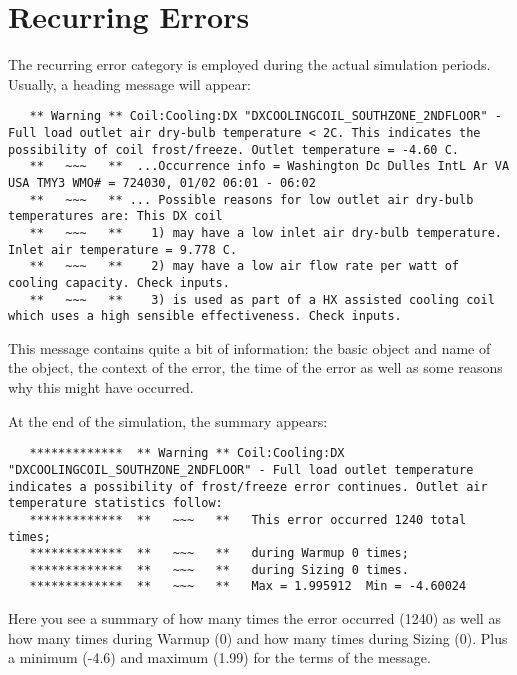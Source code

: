 \section{Recurring Errors}\label{recurring-errors}

The recurring error category is employed during the actual simulation periods. Usually, a heading message will appear:

\begin{lstlisting}
   ** Warning ** Coil:Cooling:DX "DXCOOLINGCOIL_SOUTHZONE_2NDFLOOR" - Full load outlet air dry-bulb temperature < 2C. This indicates the possibility of coil frost/freeze. Outlet temperature = -4.60 C.
   **   ~~~   **  ...Occurrence info = Washington Dc Dulles IntL Ar VA USA TMY3 WMO# = 724030, 01/02 06:01 - 06:02
   **   ~~~   ** ... Possible reasons for low outlet air dry-bulb temperatures are: This DX coil
   **   ~~~   **    1) may have a low inlet air dry-bulb temperature. Inlet air temperature = 9.778 C.
   **   ~~~   **    2) may have a low air flow rate per watt of cooling capacity. Check inputs.
   **   ~~~   **    3) is used as part of a HX assisted cooling coil which uses a high sensible effectiveness. Check inputs.
\end{lstlisting}

This message contains quite a bit of information: the basic object and name of the object, the context of the error, the time of the error as well as some reasons why this might have occurred.

At the end of the simulation, the summary appears:

\begin{lstlisting}
   *************  ** Warning ** Coil:Cooling:DX "DXCOOLINGCOIL_SOUTHZONE_2NDFLOOR" - Full load outlet temperature indicates a possibility of frost/freeze error continues. Outlet air temperature statistics follow:
   *************  **   ~~~   **   This error occurred 1240 total times;
   *************  **   ~~~   **   during Warmup 0 times;
   *************  **   ~~~   **   during Sizing 0 times.
   *************  **   ~~~   **   Max = 1.995912  Min = -4.60024
\end{lstlisting}

Here you see a summary of how many times the error occurred (1240) as well as how many times during Warmup (0) and how many times during Sizing (0). Plus a minimum (-4.6) and maximum (1.99) for the terms of the message.

